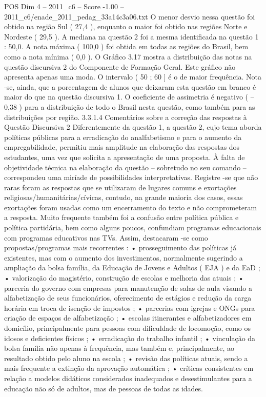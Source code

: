 \begin{textsample}{POS Dim 4 – 2011\_c6 – Score -1.00 – 2011\_c6/enade\_2011\_pedag\_33a14c3a06.txt}
O menor desvio nessa questão foi obtido na região Sul ( 27,4 ), enquanto o maior foi obtido nas regiões Norte e Nordeste ( 29,5 ).
A mediana na questão 2 foi a mesma identificada na questão 1 : 50,0.
A nota máxima ( 100,0 ) foi obtida em todas as regiões do Brasil, bem como a nota mínima ( 0,0 ).
O Gráfico 3.17 mostra a distribuição das notas na questão discursiva 2 do Componente de Formação Geral.
Este gráfico não apresenta apenas uma moda.
O intervalo ( 50 ; 60 ] é o de maior frequência.
Nota -se, ainda, que a porcentagem de alunos que deixaram esta questão em branco é maior do que na questão discursiva 1.
O coeficiente de assimetria é negativo ( – 0,38 ) para a distribuição de todo o Brasil nesta questão, como também para as distribuições por região. 3.3.1.4 Comentários sobre a correção das respostas à Questão Discursiva 2 Diferentemente da questão 1, a questão 2, cujo tema aborda políticas públicas para a erradicação do analfabetismo e para o aumento da empregabilidade, permitiu mais amplitude na elaboração das respostas dos estudantes, uma vez que solicita a apresentação de uma proposta.
À falta de objetividade técnica na elaboração da questão – sobretudo no seu comando – correspondeu uma miríade de possibilidades interpretativas.
Registre -se que não raras foram as respostas que se utilizaram de lugares comuns e exortações religiosas/humanitárias/cívicas, contudo, na grande maioria dos casos, essas exortações foram usadas como um encerramento do texto e não comprometeram a resposta.
Muito frequente também foi a confusão entre política pública e política partidária, bem como alguns poucos, confundiam programas educacionais com programas educativos nas TVs.
Assim, destacaram -se como propostas/programas mais recorrentes : • prosseguimento das políticas já existentes, mas com o aumento dos investimentos, normalmente sugerindo a ampliação da bolsa família, da Educação de Jovens e Adultos ( EJA ) e da EaD ; • valorização do magistério, construção de escolas e melhoria das atuais ; • parceria do governo com empresas para manutenção de salas de aula visando a alfabetização de seus funcionários, oferecimento de estágios e redução da carga horária em troca de isenção de impostos ; • parcerias com igrejas e ONGs para criação de espaços de alfabetização ; • escolas itinerantes e alfabetizadores em domicílio, principalmente para pessoas com dificuldade de locomoção, como os idosos e deficientes físicos ; • erradicação do trabalho infantil ; • vinculação da bolsa família não apenas à frequência, mas também e, principalmente, ao resultado obtido pelo aluno na escola ; • revisão das políticas atuais, sendo a mais frequente a extinção da aprovação automática ; • críticas consistentes em relação a modelos didáticos considerados inadequados e desestimulantes para a educação não só de adultos, mas de pessoas de todas as idades.

\end{textsample}

